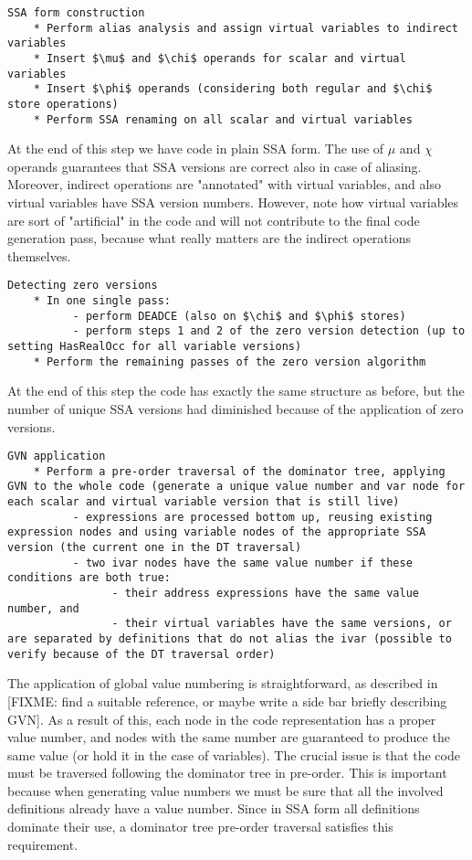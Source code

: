\begin{verbatim}
SSA form construction
    * Perform alias analysis and assign virtual variables to indirect variables
    * Insert $\mu$ and $\chi$ operands for scalar and virtual variables
    * Insert $\phi$ operands (considering both regular and $\chi$ store operations)
    * Perform SSA renaming on all scalar and virtual variables
\end{verbatim}

At the end of this step we have code in plain SSA form.
The use of $\mu$ and $\chi$ operands guarantees that SSA versions are correct also in case of aliasing.
Moreover, indirect operations are "annotated" with virtual variables, and also virtual variables have SSA version numbers.
However, note how virtual variables are sort of "artificial" in the code and will not contribute to the final code generation pass, because what really matters are the indirect operations themselves.

\begin{verbatim}
Detecting zero versions
    * In one single pass:
          - perform DEADCE (also on $\chi$ and $\phi$ stores)
          - perform steps 1 and 2 of the zero version detection (up to setting HasRealOcc for all variable versions)
    * Perform the remaining passes of the zero version algorithm
\end{verbatim}

At the end of this step the code has exactly the same structure as before, but the number of unique SSA versions had diminished because of the application of zero versions.

\begin{verbatim}
GVN application
    * Perform a pre-order traversal of the dominator tree, applying GVN to the whole code (generate a unique value number and var node for each scalar and virtual variable version that is still live)
          - expressions are processed bottom up, reusing existing expression nodes and using variable nodes of the appropriate SSA version (the current one in the DT traversal)
          - two ivar nodes have the same value number if these conditions are both true:
                - their address expressions have the same value number, and
                - their virtual variables have the same versions, or are separated by definitions that do not alias the ivar (possible to verify because of the DT traversal order)
\end{verbatim}

The application of global value numbering is straightforward, as described in [FIXME: find a suitable reference, or maybe write a side bar briefly describing GVN].
As a result of this, each node in the code representation has a proper value number, and nodes with the same number are guaranteed to produce the same value (or hold it in the case of variables).
The crucial issue is that the code must be traversed following the dominator tree in pre-order. This is important because when generating value numbers we must be sure that all the involved definitions already have a value number. Since in SSA form all definitions dominate their use, a dominator tree pre-order traversal satisfies this requirement.

